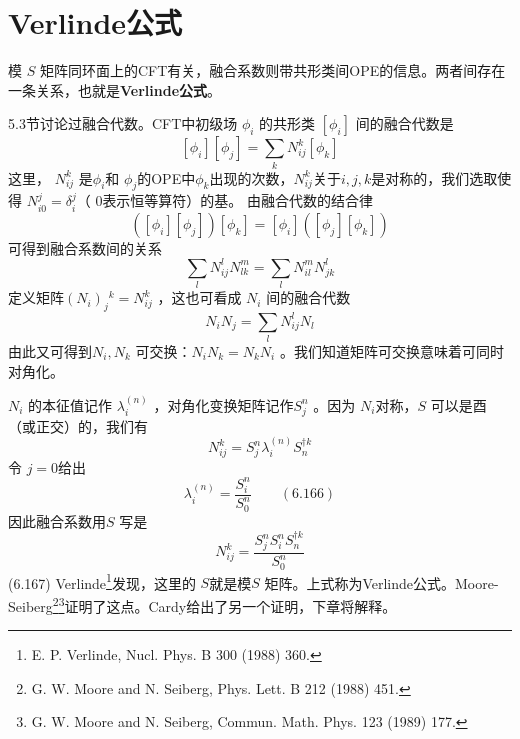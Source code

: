 \section{Verlinde公式}
模 $S$ 矩阵同环面上的CFT有关，融合系数则带共形类间OPE的信息。两者间存在一条关系，也就是\textbf{Verlinde公式}。

5.3节讨论过融合代数。CFT中初级场 $\phi_i$ 的共形类 $\left[\phi_{i}\right]$ 间的融合代数是
$$
\left[\phi_{i}\right]\left[\phi_{j}\right]=\sum_{k} N_{i j}^{k}\left[\phi_{k}\right]
$$
这里， $N_{i j}^{k}$ 是$ \phi_i $和 $\phi_j $的OPE中$ \phi_k $出现的次数，$ N_{i j}^{k} $关于$ i,j,k $是对称的，我们选取使得 $N_{i 0}^{j}=\delta_{i}^{j} $（ $0 $表示恒等算符）的基。
由融合代数的结合律
\begin{equation}
	\left(\left[\phi_{i}\right]\left[\phi_{j}\right]\right)\left[\phi_{k}\right]=\left[\phi_{i}\right]\left(\left[\phi_{j}\right]\left[\phi_{k}\right]\right) 
\end{equation}
可得到融合系数间的关系
\begin{equation}
	\sum_{l} N_{i j}^{l} N_{l k}^{m}=\sum_{l} N_{i l}^{m} N_{j k}^{l}
\end{equation}
定义矩阵$ \left(N_{i}\right)_{j}{}^{k}=N_{i j}^{k}$ ，这也可看成 $N_i$ 间的融合代数
\begin{equation}
	N_{i} N_{j}=\sum_{l} N_{i j}^{l} N_{l} 
\end{equation}
由此又可得到$ N_i,N_k$ 可交换：$ N_{i} N_{k}=N_{k} N_{i}$ 。我们知道矩阵可交换意味着可同时对角化。

$N_i$ 的本征值记作 $\lambda_{i}^{(n)}$ ，对角化变换矩阵记作$ S_{j}^{n}$ 。因为 $N_i $对称，$ S$ 可以是酉（或正交）的，我们有
\begin{equation}
	N_{i j}^{k}=S_{j}^{n} \lambda_{i}^{(n)} S_{n}^{\dagger k} 
\end{equation}
令 $j=0 $给出
\begin{equation}
\lambda_{i}^{(n)}=\frac{S_{i}^{n}}{S_{0}^{n}} \quad \quad (6.166)
\end{equation}
因此融合系数用$ S$ 写是
\begin{equation}
	N_{i j}^{k}=\frac{S_{j}^{n} S_{i}^{n} S_{n}^{\dagger k}}{S_{0}^{n}}
\end{equation} \quad \quad (6.167)
Verlinde\footnote{E. P. Verlinde, Nucl. Phys. B 300 (1988) 360.}发现，这里的 $S $就是模$ S$ 矩阵。上式称为Verlinde公式。Moore-Seiberg\footnote{G. W. Moore and N. Seiberg, Phys. Lett. B 212 (1988) 451.}\footnote{G. W. Moore and N. Seiberg, Commun. Math. Phys. 123 (1989) 177.}证明了这点。Cardy给出了另一个证明，下章将解释。

